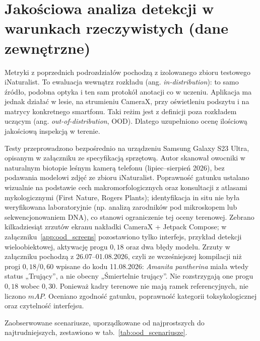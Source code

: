 \section{Jakościowa analiza detekcji w warunkach rzeczywistych (dane zewnętrzne)}\label{sec:ood_field}
Metryki z poprzednich podrozdziałów pochodzą z izolowanego zbioru testowego iNaturalist. To ewaluacja wewnątrz rozkładu (ang. \textit{in-distribution}): to samo źródło, podobna optyka i ten sam protokół anotacji co w uczeniu. Aplikacja ma jednak działać w lesie, na strumieniu CameraX, przy oświetleniu podszytu i na matrycy konkretnego smartfonu. Taki reżim jest z definicji poza rozkładem uczącym (ang. \textit{out-of-distribution}, OOD). Dlatego uzupełniono ocenę ilościową jakościową inspekcją w terenie.

Testy przeprowadzono bezpośrednio na urządzeniu Samsung Galaxy S23 Ultra, opisanym w załączniku ze specyfikacją sprzętową. Autor skanował owocniki w naturalnym biotopie leśnym kamerą telefonu (lipiec--sierpień 2026), bez podawania modelowi zdjęć ze zbioru iNaturalist. Poprawność gatunku ustalano wizualnie na podstawie cech makromorfologicznych oraz konsultacji z atlasami mykologicznymi (First Nature, Rogers Plants); identyfikacja in situ nie była weryfikowana laboratoryjnie (np. analizą zarodników pod mikroskopem lub sekwencjonowaniem DNA), co stanowi ograniczenie tej oceny terenowej. Zebrano kilkadziesiąt zrzutów ekranu nakładki CameraX + Jetpack Compose; w załączniku~\ref{app:ood_screens} pozostawiono tylko interfejs, przykład detekcji wieloobiektowej, aktywację progu $0{,}18$ oraz dwa błędy modelu. Zrzuty w załączniku pochodzą z 26.07--01.08.2026, czyli ze wcześniejszej kompilacji niż progi $0{,}18$/$0{,}60$ wpisane do kodu 11.08.2026: \textit{Amanita pantherina} miała wtedy status „Trujący”, a nie obecny „Śmiertelnie trujący”. Nie rozstrzygają one progu $0{,}18$ wobec $0{,}30$. Ponieważ kadry terenowe nie mają ramek referencyjnych, nie liczono $mAP$. Oceniano zgodność gatunku, poprawność kategorii toksykologicznej oraz czytelność interfejsu.

Zaobserwowane scenariusze, uporządkowane od najprostszych do najtrudniejszych, zestawiono w tab.~\ref{tab:ood_scenariusze}.

